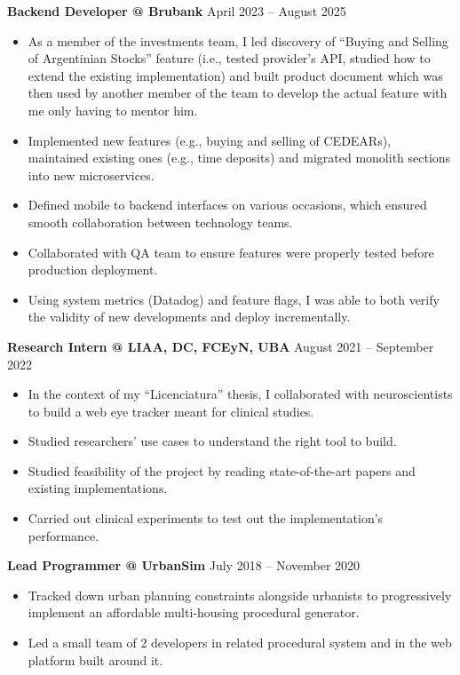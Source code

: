 \documentclass[a4paper]{article}
\begin{document}
\textbf{Backend Developer @ Brubank} \hfill April 2023 -- August 2025
\begin{itemize}
  \item As a member of the investments team, I led discovery of ``Buying and
    Selling of Argentinian Stocks'' feature (i.e., tested provider's API, studied
    how to extend the existing implementation) and built product document which
    was then used by another member of the team to develop the actual feature
    with me only having to mentor him.
  \item Implemented new features (e.g., buying and selling of CEDEARs),
    maintained existing ones (e.g., time deposits) and migrated monolith
    sections into new microservices.
  \item Defined mobile to backend interfaces on various occasions, which
    ensured smooth collaboration between technology teams.
  \item Collaborated with QA team to ensure features were properly tested
    before production deployment.
  \item Using system metrics (Datadog) and feature flags, I was able to
    both verify the validity of new developments and deploy incrementally.
\end{itemize}

\textbf{Research Intern @ LIAA, DC, FCEyN, UBA} \hfill August 2021 -- September 2022
\begin{itemize}
  \item In the context of my ``Licenciatura'' thesis, I collaborated with neuroscientists to build a web eye
    tracker meant for clinical studies.
  \item Studied researchers' use cases to understand the right tool to build.
  \item Studied feasibility of the project by reading state-of-the-art papers
    and existing implementations.
  \item Carried out clinical experiments to test out the implementation's performance.
\end{itemize}

\textbf{Lead Programmer @ UrbanSim} \hfill July 2018 -- November 2020
\begin{itemize}
  \item Tracked down urban planning constraints alongside urbanists to progressively
  implement an affordable multi-housing procedural generator.
  \item Led a small team of 2 developers in related procedural system and in the web
    platform built around it.
\end{itemize}
\end{document}
